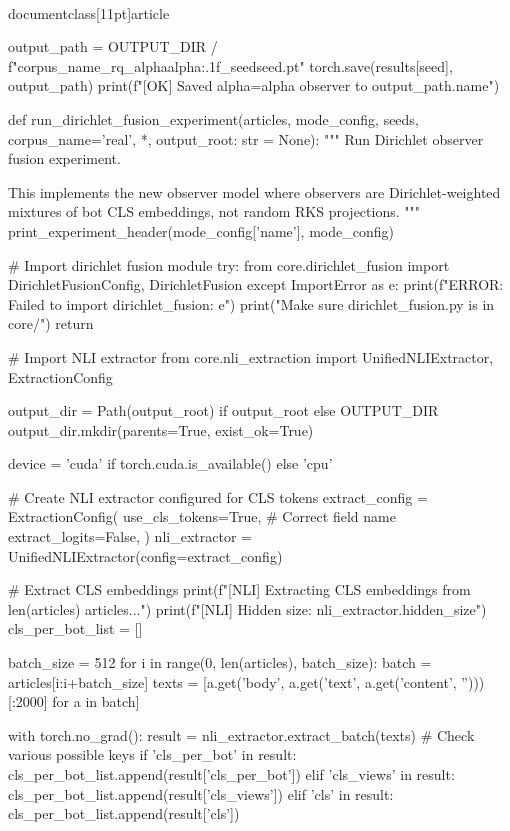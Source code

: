 \\documentclass[11pt]{article}
\begin{document}
\begin{CodeBlock}
        output_path = OUTPUT_DIR / f"{corpus_name}_rq_alpha{alpha:.1f}_seed{seed}.pt"
        torch.save(results[seed], output_path)
        print(f"[OK] Saved alpha={alpha} observer to {output_path.name}")


def run_dirichlet_fusion_experiment(articles, mode_config, seeds, corpus_name='real', *, output_root: str = None):
    """
    Run Dirichlet observer fusion experiment.
    
    This implements the new observer model where observers are Dirichlet-weighted
    mixtures of bot CLS embeddings, not random RKS projections.
    """
    print_experiment_header(mode_config['name'], mode_config)
    
    # Import dirichlet fusion module
    try:
        from core.dirichlet_fusion import DirichletFusionConfig, DirichletFusion
    except ImportError as e:
        print(f"ERROR: Failed to import dirichlet_fusion: {e}")
        print("Make sure dirichlet_fusion.py is in core/")
        return {}
    
    # Import NLI extractor
    from core.nli_extraction import UnifiedNLIExtractor, ExtractionConfig
    
    output_dir = Path(output_root) if output_root else OUTPUT_DIR
    output_dir.mkdir(parents=True, exist_ok=True)
    
    device = 'cuda' if torch.cuda.is_available() else 'cpu'
    
    # Create NLI extractor configured for CLS tokens
    extract_config = ExtractionConfig(
        use_cls_tokens=True,  # Correct field name
        extract_logits=False,
    )
    nli_extractor = UnifiedNLIExtractor(config=extract_config)
    
    # Extract CLS embeddings
    print(f"[NLI] Extracting CLS embeddings from {len(articles)} articles...")
    print(f"[NLI] Hidden size: {nli_extractor.hidden_size}")
    cls_per_bot_list = []
    
    batch_size = 512
    for i in range(0, len(articles), batch_size):
        batch = articles[i:i+batch_size]
        texts = [a.get('body', a.get('text', a.get('content', '')))[:2000] for a in batch]
        
        with torch.no_grad():
            result = nli_extractor.extract_batch(texts)
            # Check various possible keys
            if 'cls_per_bot' in result:
                cls_per_bot_list.append(result['cls_per_bot'])
            elif 'cls_views' in result:
                cls_per_bot_list.append(result['cls_views'])
            elif 'cls' in result:
                cls_per_bot_list.append(result['cls'])
        

\end{CodeBlock}
\end{document}
